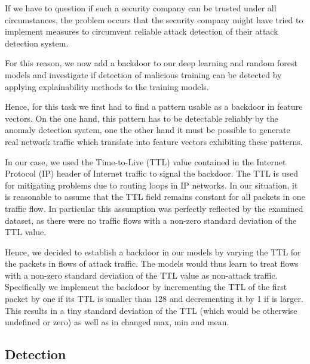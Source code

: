 \documentclass[sigconf,nonacm]{acmart}
\begin{document}
If we have to question if such a security company can be trusted under all circumstances, the problem occurs that the security company might have tried to implement measures to circumvent reliable attack detection of their attack detection system. 

For this reason, we now add a backdoor to our deep learning and random forest models and investigate if detection of malicious training can be detected by applying explainability methods to the training models.

Hence, for this task we first had to find a pattern usable as a backdoor in feature vectors. On the one hand, this pattern has to be detectable reliably by the anomaly detection system, one the other hand it must be possible to generate real network traffic which translate into feature vectors exhibiting these patterns.

In our case, we used the Time-to-Live (TTL) value contained in the Internet Protocol (IP) header of Internet traffic to signal the backdoor. The TTL is used for mitigating problems due to routing loops in IP networks. In our situation, it is reasonable to assume that the TTL field remains constant for all packets in one traffic flow. In particular this assumption was perfectly reflected by the examined dataset, as there were no traffic flows with a non-zero standard deviation of the TTL value.

Hence, we decided to establish a backdoor in our models by varying the TTL for the packets in flows of attack traffic.  The models would thus learn to treat flows with a non-zero standard deviation of the TTL value as non-attack traffic. Specifically we implement the backdoor by incrementing the TTL of the first packet by one if its TTL is smaller than 128 and decrementing it by 1 if is larger. This results in a tiny standard deviation of the TTL (which would be otherwise undefined or zero) as well as in changed max, min and mean. 

\subsection{Detection}
\end{document}
